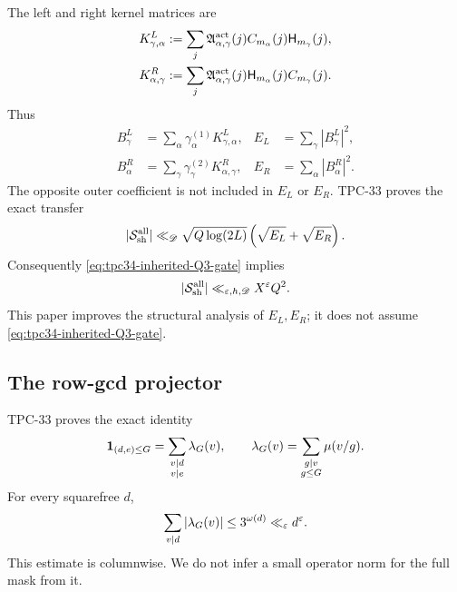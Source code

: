 The left and right kernel matrices are
\begin{align}
 K^L_{\gamma,\alpha}
 &:=
 \sum_j\mathfrak A_{\alpha,\gamma}^{\rm act}(j)
 C_{m_\alpha}(j)\mathsf H_{m_\gamma}(j),
 \label{eq:tpc34-left-matrix}\\
 K^R_{\alpha,\gamma}
 &:=
 \sum_j\mathfrak A_{\alpha,\gamma}^{\rm act}(j)
 \mathsf H_{m_\alpha}(j)C_{m_\gamma}(j).
 \label{eq:tpc34-right-matrix}
\end{align}
Thus
\begin{align}
 B_\gamma^L
 &=\sum_\alpha\gamma_\alpha^{(1)}K^L_{\gamma,\alpha},
 &E_L&=\sum_\gamma|B_\gamma^L|^2,
 \label{eq:tpc34-left-energy}\\
 B_\alpha^R
 &=\sum_\gamma\gamma_\gamma^{(2)}K^R_{\alpha,\gamma},
 &E_R&=\sum_\alpha|B_\alpha^R|^2.
 \label{eq:tpc34-right-energy}
\end{align}
The opposite outer coefficient is not included in \(E_L\) or \(E_R\).
TPC-33 proves the exact transfer
\begin{equation}
 |\mathcal S_{\rm sh}^{\rm all}|
 \ll_{\mathscr D}\sqrt{Q\log(2L)}
 \left(\sqrt{E_L}+\sqrt{E_R}\right).
 \label{eq:tpc34-inherited-energy-transfer}
\end{equation}
Consequently \eqref{eq:tpc34-inherited-Q3-gate} implies
\begin{equation}
 |\mathcal S_{\rm sh}^{\rm all}|
 \ll_{\varepsilon,h,\mathscr D}X^\varepsilon Q^2.
 \label{eq:tpc34-inherited-Q2-output}
\end{equation}
This paper improves the structural analysis of \(E_L,E_R\); it does not
assume \eqref{eq:tpc34-inherited-Q3-gate}.

\subsection{The row-gcd projector}

TPC-33 proves the exact identity
\begin{equation}
 \mathbf 1_{(d,e)\le G}
 =\sum_{\substack{v\mid d\\v\mid e}}\lambda_G(v),
 \qquad
 \lambda_G(v)=\sum_{\substack{g\mid v\\g\le G}}\mu(v/g).
 \label{eq:tpc34-gcd-projector}
\end{equation}
For every squarefree \(d\),
\begin{equation}
 \sum_{v\mid d}|\lambda_G(v)|
 \le3^{\omega(d)}
 \ll_\varepsilon d^\varepsilon.
 \label{eq:tpc34-gcd-projector-mass}
\end{equation}
This estimate is columnwise.  We do not infer a small operator norm for
the full mask from it.

